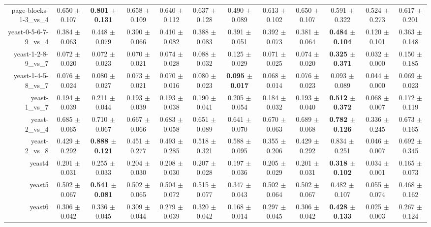 \begin{table}[!ht]
{\begin{tabular}{r c c c c c c c c c c c}
page-blocks-1-3\_vs\_4 & 0.650 $\pm$ 0.107 & \textbf{0.801 $\pm$ 0.131} & 0.658 $\pm$ 0.109 & 0.640 $\pm$ 0.112 & 0.637 $\pm$ 0.128 & 0.490 $\pm$ 0.089 & 0.613 $\pm$ 0.102 & 0.650 $\pm$ 0.107 & 0.591 $\pm$ 0.322 & 0.524 $\pm$ 0.273 & 0.617 $\pm$ 0.201 \\
yeast-0-5-6-7-9\_vs\_4 & 0.384 $\pm$ 0.063 & 0.448 $\pm$ 0.079 & 0.390 $\pm$ 0.066 & 0.410 $\pm$ 0.082 & 0.388 $\pm$ 0.083 & 0.391 $\pm$ 0.051 & 0.392 $\pm$ 0.073 & 0.381 $\pm$ 0.064 & \textbf{0.484 $\pm$ 0.104} & 0.120 $\pm$ 0.101 & 0.363 $\pm$ 0.148 \\
yeast-1-2-8-9\_vs\_7 & 0.072 $\pm$ 0.020 & 0.072 $\pm$ 0.023 & 0.070 $\pm$ 0.021 & 0.074 $\pm$ 0.028 & 0.088 $\pm$ 0.032 & 0.125 $\pm$ 0.029 & 0.071 $\pm$ 0.025 & 0.074 $\pm$ 0.020 & \textbf{0.325 $\pm$ 0.371} & 0.032 $\pm$ 0.000 & 0.150 $\pm$ 0.185 \\
yeast-1-4-5-8\_vs\_7 & 0.076 $\pm$ 0.024 & 0.080 $\pm$ 0.027 & 0.073 $\pm$ 0.021 & 0.070 $\pm$ 0.016 & 0.080 $\pm$ 0.023 & \textbf{0.095 $\pm$ 0.017} & 0.068 $\pm$ 0.014 & 0.076 $\pm$ 0.023 & 0.093 $\pm$ 0.089 & 0.044 $\pm$ 0.000 & 0.069 $\pm$ 0.023 \\
yeast-1\_vs\_7 & 0.194 $\pm$ 0.039 & 0.211 $\pm$ 0.044 & 0.193 $\pm$ 0.039 & 0.193 $\pm$ 0.038 & 0.190 $\pm$ 0.041 & 0.205 $\pm$ 0.054 & 0.184 $\pm$ 0.032 & 0.193 $\pm$ 0.040 & \textbf{0.512 $\pm$ 0.372} & 0.068 $\pm$ 0.007 & 0.172 $\pm$ 0.119 \\
yeast-2\_vs\_4 & 0.685 $\pm$ 0.065 & 0.710 $\pm$ 0.067 & 0.667 $\pm$ 0.066 & 0.683 $\pm$ 0.058 & 0.651 $\pm$ 0.089 & 0.641 $\pm$ 0.070 & 0.670 $\pm$ 0.063 & 0.689 $\pm$ 0.068 & \textbf{0.782 $\pm$ 0.126} & 0.336 $\pm$ 0.245 & 0.673 $\pm$ 0.165 \\
yeast-2\_vs\_8 & 0.429 $\pm$ 0.292 & \textbf{0.888 $\pm$ 0.121} & 0.451 $\pm$ 0.277 & 0.493 $\pm$ 0.285 & 0.518 $\pm$ 0.321 & 0.588 $\pm$ 0.095 & 0.355 $\pm$ 0.206 & 0.429 $\pm$ 0.292 & 0.834 $\pm$ 0.251 & 0.046 $\pm$ 0.007 & 0.692 $\pm$ 0.345 \\
yeast4 & 0.201 $\pm$ 0.031 & 0.255 $\pm$ 0.033 & 0.204 $\pm$ 0.030 & 0.208 $\pm$ 0.030 & 0.207 $\pm$ 0.028 & 0.197 $\pm$ 0.036 & 0.205 $\pm$ 0.029 & 0.201 $\pm$ 0.031 & \textbf{0.318 $\pm$ 0.102} & 0.034 $\pm$ 0.001 & 0.165 $\pm$ 0.073 \\
yeast5 & 0.502 $\pm$ 0.067 & \textbf{0.541 $\pm$ 0.081} & 0.502 $\pm$ 0.065 & 0.504 $\pm$ 0.072 & 0.515 $\pm$ 0.077 & 0.347 $\pm$ 0.043 & 0.502 $\pm$ 0.064 & 0.502 $\pm$ 0.067 & 0.482 $\pm$ 0.107 & 0.055 $\pm$ 0.074 & 0.468 $\pm$ 0.162 \\
yeast6 & 0.306 $\pm$ 0.042 & 0.336 $\pm$ 0.045 & 0.309 $\pm$ 0.044 & 0.279 $\pm$ 0.039 & 0.320 $\pm$ 0.042 & 0.168 $\pm$ 0.014 & 0.297 $\pm$ 0.045 & 0.306 $\pm$ 0.042 & \textbf{0.428 $\pm$ 0.133} & 0.025 $\pm$ 0.003 & 0.267 $\pm$ 0.124 \\

\end{tabular}}
\end{table}
